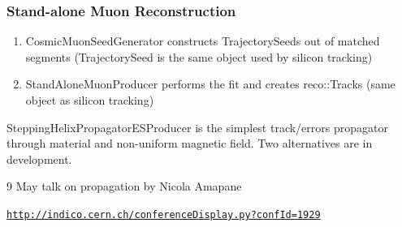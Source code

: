 \documentclass[12pt,compress]{beamer}
\begin{document}
\begin{frame}
\frametitle{Stand-alone Muon Reconstruction}
\begin{enumerate}
\item CosmicMuonSeedGenerator constructs TrajectorySeeds out of
matched segments (TrajectorySeed is the same object used by silicon
tracking)
\item StandAloneMuonProducer performs the fit and creates reco::Tracks
(same object as silicon tracking)
\end{enumerate}

\vfill
SteppingHelixPropagatorESProducer is the simplest track/errors
propagator through material and non-uniform magnetic field.  Two
alternatives are in development.

\vfill
9 May talk on propagation by Nicola Amapane

{\tt \scriptsize \href{http://indico.cern.ch/conferenceDisplay.py?confId=1929}{http://indico.cern.ch/conferenceDisplay.py?confId=1929}}

\end{frame}
\end{document}
